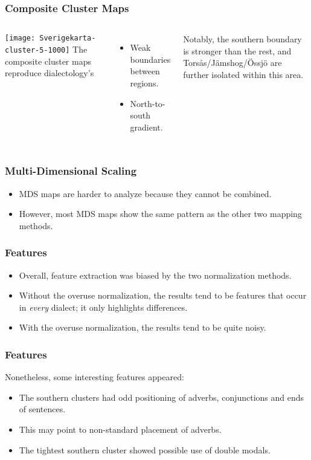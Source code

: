 \documentclass{beamer}
\begin{document}
\begin{frame}
  \frametitle{Composite Cluster Maps}
\begin{columns}
\texttt{[image: Sverigekarta-cluster-5-1000]}
The composite cluster maps reproduce dialectology's
  \begin{itemize}
  \item Weak boundaries between regions.
  \item North-to-south gradient.
\end{itemize}
 Notably, the southern boundary is stronger than the rest, and
    Tors\aa{}s/J\"amshog/\"Ossj\"o are further isolated within this area.
\end{columns}
\end{frame}
\begin{frame}
  \frametitle{Multi-Dimensional Scaling}
  \begin{itemize}
  \item MDS maps are harder to analyze because they cannot be combined.
  \item However, most MDS maps show the same pattern as the other two
    mapping methods.
 \end{itemize}
\end{frame}
\begin{frame}
  \frametitle{Features}
  \begin{itemize}
  \item Overall, feature extraction was biased by the two
    normalization methods.
  \item Without the overuse normalization, the results tend to be
    features that occur in {\it every} dialect; it only highlights
    differences.
  \item With the overuse normalization, the results tend to be quite
    noisy.
  \end{itemize}
\end{frame}
\begin{frame}
  \frametitle{Features}
  Nonetheless, some interesting features appeared:
  \begin{itemize}
  \item The southern clusters had odd positioning of adverbs,
    conjunctions and ends of sentences.
  \item This may point to non-standard placement of adverbs.
  \item The tightest southern cluster showed possible use of double modals.
  \end{itemize}
\end{frame}
\end{document}
